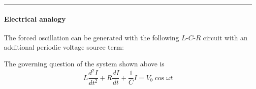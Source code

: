 \documentclass[12pt,a4paper]{article}
\begin{document}
\hrule \vspace{.1cm}
\paragraph{Electrical analogy} The forced oscillation can be generated with the following $L$-$C$-$R$ circuit with an additional periodic voltage source term:
\begin{figure}[H]
    \centering
\end{figure}
The governing question of the system shown above is
\[
    L \frac{d^2I}{dt^2} + R\frac{dI}{dt} + \frac{1}{C}I = V_0 \cos \omega t
\]
\end{document}
